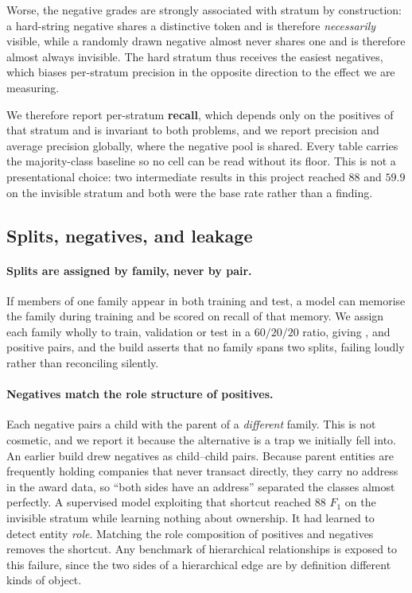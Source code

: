 Worse, the negative grades are strongly associated with stratum by construction: a
hard-string negative shares a distinctive token and is therefore \emph{necessarily}
visible, while a randomly drawn negative almost never shares one and is therefore almost
always invisible. The hard stratum thus receives the easiest negatives, which biases
per-stratum precision in the opposite direction to the effect we are measuring.

We therefore report per-stratum \textbf{recall}, which depends only on the positives of
that stratum and is invariant to both problems, and we report precision and average
precision globally, where the negative pool is shared. Every table carries the
majority-class baseline so no cell can be read without its floor. This is not a
presentational choice: two intermediate results in this project reached $88$ and $59.9$
on the invisible stratum and both were the base rate rather than a finding.

\subsection{Splits, negatives, and leakage}
\label{sec:splits}

\paragraph{Splits are assigned by family, never by pair.} If members of one family appear
in both training and test, a model can memorise the family during training and be scored
on recall of that memory. We assign each family wholly to train, validation or test in a
$60/20/20$ ratio, giving \BenchPosTrain, \BenchPosVal and \BenchPosTest positive pairs,
and the build asserts that no family spans two splits, failing loudly rather than
reconciling silently.

\paragraph{Negatives match the role structure of positives.} Each negative pairs a child
with the parent of a \emph{different} family. This is not cosmetic, and we report it
because the alternative is a trap we initially fell into. An earlier build drew negatives
as child--child pairs. Because parent entities are frequently holding companies that never
transact directly, they carry no address in the award data, so ``both sides have an
address'' separated the classes almost perfectly. A supervised model exploiting that
shortcut reached $88$ $F_1$ on the invisible stratum while learning nothing about
ownership. It had learned to detect entity \emph{role}. Matching the role composition
of positives and negatives removes the shortcut. Any benchmark of hierarchical
relationships is exposed to this failure, since the two sides of a hierarchical edge are
by definition different kinds of object.

